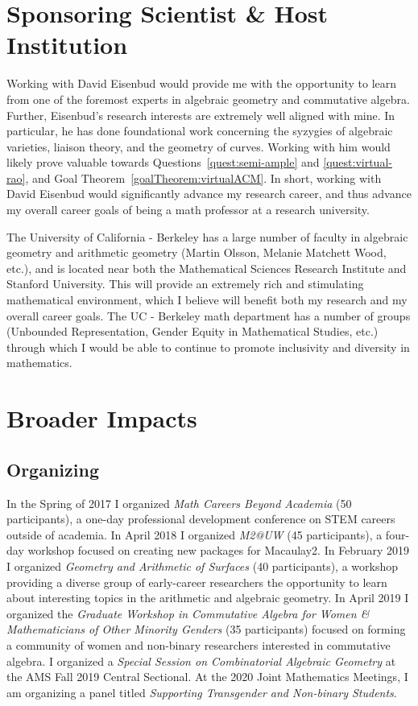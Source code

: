 \documentclass[11pt,reqno]{amsart}
\theoremstyle{remark}
\begin{document}
 \section{Sponsoring Scientist \& Host Institution}
 
Working with David Eisenbud would provide me with the opportunity to learn from one of the foremost experts in algebraic geometry and commutative algebra. Further, Eisenbud's research interests are extremely well aligned with mine. In particular, he has done foundational work concerning the syzygies of algebraic varieties, liaison theory, and the geometry of curves. Working with him would likely prove valuable towards Questions~\ref{quest:semi-ample} and \ref{quest:virtual-rao}, and Goal Theorem~\ref{goalTheorem:virtualACM}. In short, working with David Eisenbud would significantly advance my research career, and thus advance my overall career goals of being a math professor at a research university.

The University of California - Berkeley has a large number of faculty in algebraic geometry and arithmetic geometry (Martin Olsson, Melanie Matchett Wood, etc.), and is located near both the Mathematical Sciences Research Institute and Stanford University. This will provide an extremely rich and stimulating mathematical environment, which I believe will benefit both my research and my overall career goals. The UC - Berkeley math department has a number of groups (Unbounded Representation, Gender Equity in Mathematical Studies, etc.) through which I would be able to continue to promote inclusivity and diversity in mathematics. 

\section{Broader Impacts}

\subsection{Organizing}
In the Spring of 2017 I organized \textit{Math Careers Beyond Academia } (50 participants), a one-day professional development conference on STEM careers outside of academia. In April 2018 I organized \textit{M2@UW} (45 participants), a four-day workshop focused on creating new packages for Macaulay2. In February 2019 I organized \textit{Geometry and Arithmetic of Surfaces} (40 participants), a workshop providing a diverse group of early-career researchers the opportunity to learn about interesting topics in the arithmetic and algebraic geometry. In April 2019 I organized the \textit{Graduate Workshop in Commutative Algebra for Women \& Mathematicians of Other Minority Genders} (35 participants)  focused on forming a community of women and non-binary researchers interested in commutative algebra. I organized a \textit{Special Session on Combinatorial Algebraic Geometry} at the AMS Fall 2019 Central Sectional. At the 2020 Joint Mathematics Meetings, I am organizing a panel titled \textit{Supporting Transgender and Non-binary Students}. 
\end{document}
